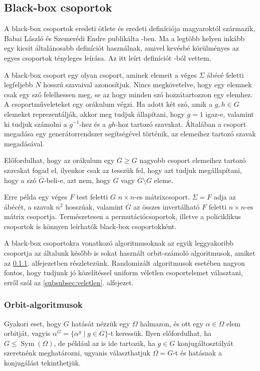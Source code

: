 \subsection{Black-box csoportok}
\label{subsec:blackbox}
A black-box csoportok eredeti ötlete és eredeti definíciója magyaroktól származik,
Babai László és Szemerédi Endre publikálta \cite{BS84}-ben.
Ma a legtöbb helyen inkább egy kicsit általánosabb definíciót használnak, amivel kevésbé körülményes az
egyes csoportok tényleges leírása. Az itt leírt definíciót \cite{Ser03}-ból vettem.

A black-box csoport egy olyan csoport,
aminek elemeit a véges $\Sigma$ ábécé feletti legfeljebb $N$ hosszú szavaival azonosítjuk.
Nincs megkövetelve, hogy egy elemnek csak egy szó felelhessen meg, se az hogy minden szó hozzátartozzon
egy elemhez.
A csoportműveleteket egy orákulum végzi.
Ha adott két szó, amik a $g, h\in G$ elemeket reprezentálják,
akkor meg tudjuk állapítani, hogy $g=1$ igaz-e,
valamint ki tudjuk számolni a $g^{-1}$-hez és a $gh$-hoz tartozó szavakat.
Általában a csoport megadása egy generátorrendszer segítségével történik, az elemeihez tartozó szavak megadásával.

Előfordulhat, hogy az orákulum egy $\overline{G} \ge G$ nagyobb csoport elemeihez tartozó szavakat fogad el,
ilyenkor csak az tesszük fel, hogy azt tudjuk megállapítani, hogy a szó $\overline{G}$-beli-e,
azt nem, hogy $G$ vagy $\overline{G}\setminus G$ eleme.

Erre példa egy véges $F$ test feletti $G$ $n\times n$-es mátrixcsoport.
$\Sigma=F$ adja az ábécét, a szavak $n^2$ hosszúak,
valamint $\overline{G}$ az összes invertálható $F$ feletti $n\times n$-es mátrix csoportja.
Természetesen a permutációcsoportok, illetve a policiklikus csoportok is könnyen leírhatók black-box csoportokként.

A black-box csoportokra vonatkozó algoritmusoknak az egyik leggyakoribb csoportja az általunk később is sokat használt
orbit-számoló algoritmusok, amiket az \ref{subsubsec:orbit}. alfejezetben részletezünk.
Randomizált algoritmusok esetében nagyon fontos, hogy tudjunk jó közelítéssel uniform véletlen csoportelemet választani,
erről szól az \ref{subsubsec:veletlen}. alfejezet.

\subsubsection{Orbit-algoritmusok}
\label{subsubsec:orbit}
Gyakori eset, hogy $G$ hatását nézzük egy $\Omega$ halmazon, és ott egy $\alpha\in\Omega$ elem orbitját,
vagyis $\alpha^G = \{ \alpha^g \mid g \in G \}$-t keressük. Ilyen előfordulhat, ha $G \le \mathop{Sym}(\Omega)$,
de például az is ide tartozik, ha $g \in G$ konjugáltosztályát szeretnénk meghatározni, ugyanis választhatjuk
$\Omega=G$-t és hatásnak a konjugálást tekinthetjük.

